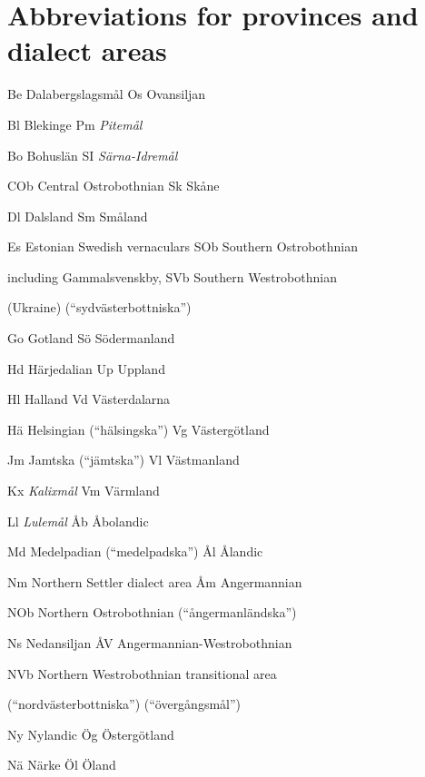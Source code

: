 
\chapter[Abbreviations for provinces and dialect areas]{\rmfamily Abbreviations for provinces and dialect areas}

Be  Dalabergslagsmål  Os  Ovansiljan

Bl  Blekinge  Pm  \textit{Pitemål}

Bo  Bohuslän  SI  \textit{Särna-Idremål}

COb  Central Ostrobothnian  Sk  Skåne

Dl  Dalsland  Sm  Småland

Es  Estonian Swedish vernaculars   SOb  Southern Ostrobothnian

  including Gammalsvenskby,  SVb  Southern Westrobothnian

  (Ukraine)    (“sydvästerbottniska”)

Go  Gotland  Sö  Södermanland

Hd  Härjedalian  Up  Uppland

Hl  Halland  Vd  Västerdalarna

Hä  Helsingian (“hälsingska”)  Vg  Västergötland

Jm  Jamtska (“jämtska”)  Vl  Västmanland

Kx  \textit{Kalixmål}  Vm  Värmland

Ll  \textit{Lulemål}  Åb  Åbolandic

Md  Medelpadian (“medelpadska”)  Ål  Ålandic

Nm  Northern Settler dialect area  Åm  Angermannian

NOb  Northern Ostrobothnian    (“ångermanländska”)

Ns  Nedansiljan  ÅV  Angermannian-Westrobothnian

NVb  Northern Westrobothnian    transitional area

  (“nordvästerbottniska”)    (“övergångsmål”)

Ny  Nylandic  Ög  Östergötland

Nä  Närke  Öl  Öland
